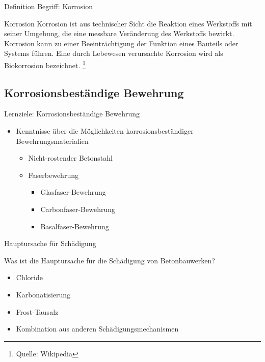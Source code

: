 \begin{frame}{Definition Begriff: Korrosion}
	\begin{Definition_BS}{Korrosion}
		Korrosion ist aus technischer Sicht die Reaktion eines Werkstoffs mit seiner Umgebung, die
		eine messbare Veränderung des Werkstoffs bewirkt. Korrosion kann zu einer Beeinträchtigung
		der Funktion eines Bauteils oder Systems führen. Eine durch Lebewesen verursachte Korrosion
		wird als Biokorrosion bezeichnet. \footnote{Quelle: Wikipedia}
	\end{Definition_BS}
\end{frame}

\subsection{Korrosionsbeständige Bewehrung}

\begin{frame}{Lernziele: Korrosionsbeständige Bewehrung}
	\begin{myLernziele}
		\begin{itemize}
			\item[\textbullet] Kenntnisse über die Möglichkeiten korrosionsbeständiger Bewehrungsmaterialien
			      \begin{itemize}
			      	\item Nicht-rostender Betonstahl
			      	\item Faserbewehrung
			      	      \begin{itemize}
			      	      	\item Glasfaser-Bewehrung
			      	      	\item Carbonfaser-Bewehrung
			      	      	\item Basalfaser-Bewehrung
			      	      \end{itemize}
			      \end{itemize}
		\end{itemize}
	\end{myLernziele}
\end{frame}

\begin{frame}{Hauptursache für Schädigung}
    \begin{Fragenblock}
        Was ist die Hauptursache für die Schädigung von Betonbauwerken?
        
        \begin{itemize}
            \item[\faSquare] Chloride
            \item[\faSquare] Karbonatisierung
            \item[\faSquare] Frost-Tausalz
            \item[\faSquare] Kombination aus anderen Schädigungsmechanismen
        \end{itemize}
        
    \end{Fragenblock}
\end{frame}
    

